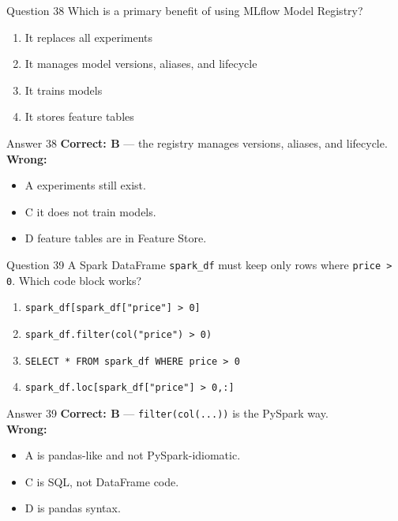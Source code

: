 \documentclass[aspectratio=169,11pt]{beamer}
\begin{document}
	\begin{frame}{Question 38}
		Which is a primary benefit of using MLflow Model Registry?
		\begin{enumerate}[label=\Alph*.]
			\item It replaces all experiments
			\item It manages model versions, aliases, and lifecycle
			\item It trains models
			\item It stores feature tables
		\end{enumerate}
	\end{frame}
	\begin{frame}{Answer 38}
		\textbf{Correct: B} --- the registry manages versions, aliases, and lifecycle.\\
		\vspace{0.5em}
		\textbf{Wrong:}
		\begin{itemize}
			\item A experiments still exist.
			\item C it does not train models.
			\item D feature tables are in Feature Store.
		\end{itemize}
	\end{frame}
	
	\begin{frame}{Question 39}
		A Spark DataFrame \texttt{spark\_df} must keep only rows where \texttt{price > 0}. Which code block works?
		\begin{enumerate}[label=\Alph*.]
			\item \texttt{spark\_df[spark\_df["price"] > 0]}
			\item \texttt{spark\_df.filter(col("price") > 0)}
			\item \texttt{SELECT * FROM spark\_df WHERE price > 0}
			\item \texttt{spark\_df.loc[spark\_df["price"] > 0,:]}
		\end{enumerate}
	\end{frame}
	\begin{frame}{Answer 39}
		\textbf{Correct: B} --- \texttt{filter(col(...))} is the PySpark way.\\
		\vspace{0.5em}
		\textbf{Wrong:}
		\begin{itemize}
			\item A is pandas-like and not PySpark-idiomatic.
			\item C is SQL, not DataFrame code.
			\item D is pandas syntax.
		\end{itemize}
	\end{frame}
	
\end{document}
